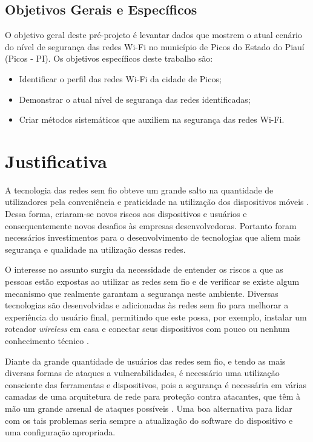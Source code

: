 \documentclass[
	article,			%
	11pt,				%
	oneside,			%
	a4paper,			%
	english,			%
	brazil,				%
	sumario=tradicional
	]{abntex2}
\begin{document}
\subsection{Objetivos Gerais e Específicos}
O objetivo geral deste pré-projeto é levantar dados que mostrem o atual cenário do nível de segurança das redes Wi-Fi no município de Picos do Estado do Piauí (Picos - PI). Os objetivos específicos deste trabalho são:
\begin{itemize}
   \item Identificar o perfil das redes Wi-Fi da cidade de Picos;
   \item Demonstrar o atual nível de segurança das redes identificadas; 
   \item Criar métodos sistemáticos que auxiliem na segurança das redes Wi-Fi.
\end{itemize}

\section{Justificativa}
A tecnologia das redes sem fio obteve um grande salto na quantidade de utilizadores pela conveniência e praticidade na utilização dos dispositivos móveis \cite{tanenbaum2011redes}. Dessa forma, criaram-se novos riscos aos dispositivos e usuários e consequentemente novos desafios às empresas desenvolvedoras. Portanto foram necessários investimentos para o desenvolvimento de tecnologias que aliem mais segurança e qualidade na utilização dessas redes.

O interesse no assunto surgiu da necessidade de entender os riscos a que as pessoas estão expostas ao utilizar as redes sem fio e de verificar se existe algum mecanismo que realmente garantam a segurança neste ambiente. Diversas tecnologias são desenvolvidas e adicionadas às redes sem fio para melhorar a experiência do usuário final, permitindo que este possa, por exemplo, instalar um roteador \textit{wireless} em casa e conectar seus dispositivos com pouco ou nenhum conhecimento técnico \cite{silva2014vulnerabilidade}.

Diante da grande quantidade de usuários das redes sem fio, e tendo as mais diversas formas de ataques a vulnerabilidades, é necessário uma utilização consciente das ferramentas e dispositivos, pois a segurança é necessária em várias camadas de uma arquitetura de rede para proteção contra atacantes, que têm à mão um grande arsenal de ataques possíveis \cite{kurose2007redes}. Uma boa alternativa para lidar com os tais problemas seria sempre a atualização do software do dispositivo e uma configuração apropriada.
\end{document}
